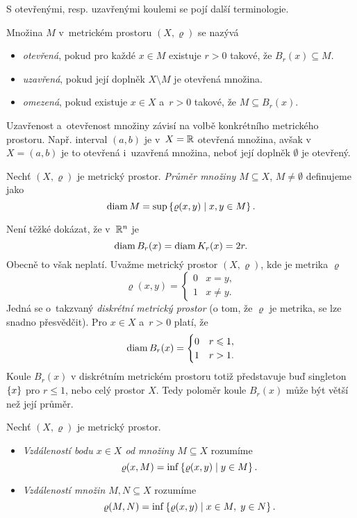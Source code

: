 S otevřenými, resp. uzavřenými koulemi se pojí další terminologie.
\begin{definition}\label{def:otevrena-uzavrena-omezena-mnozina}
     Množina $M$ v~metrickém prostoru $(X,\varrho)$ se nazývá
     \begin{itemize}
        \item \emph{otevřená}, pokud pro každé $x\in M$ existuje $r>0$ takové, že $B_r(x)\subseteq M$.
        \item \emph{uzavřená}, pokud její doplněk $X\setminus M$ je otevřená množina.
        \item \emph{omezená}, pokud existuje $x\in X$ a~$r>0$ takové, že $M\subseteq B_r(x)$.
     \end{itemize}
\end{definition}
Uzavřenost a~otevřenost množiny závisí na volbě konkrétního metrického prostoru. Např. interval $(a,b)$ je v~$X=\mathbb{R}$ otevřená množina, avšak v~$X=(a,b)$ je to otevřená i~uzavřená množina, neboť její doplněk $\emptyset$ je otevřený.
\begin{definition}\label{def:prumer-mnoziny}
    Nechť $(X,\varrho)$ je metrický prostor. \emph{Průměr množiny $M\subseteq X$}, $M\neq\emptyset$ definujeme jako
    \[\operatorname{diam}{M}=\sup\left\{\varrho(x,y)\mid x,y\in M\right\}.\]
\end{definition}
Není těžké dokázat, že v~$\mathbb{R}^n$ je
\[\operatorname{diam}{B_r(x)}=\operatorname{diam}{K_r(x)}=2r.\]
Obecně to však neplatí. Uvažme metrický prostor $(X,\varrho)$, kde je metrika $\varrho$
\[\varrho(x,y)=\begin{cases}
    0 & x=y,\\
    1 & x\neq y.
\end{cases}\]
Jedná se o~takzvaný \emph{diskrétní metrický prostor} (o tom, že $\varrho$ je metrika, se lze snadno přesvědčit). Pro $x\in X$ a~$r>0$ platí, že
\[\operatorname{diam}{B_r(x)}=\begin{cases}
    0 & r\leqslant 1,\\
    1 & r>1.
\end{cases}\]
Koule $B_r(x)$ v diskrétním metrickém prostoru totiž představuje buď singleton $\left\{x\right\}$ pro $r\leqslant 1$, nebo celý prostor $X$. Tedy poloměr koule $B_r(x)$ může být větší než její průměr.

\begin{definition}\label{def:vzdalenost-bodu-od-mnoziny-vzdalenost-mnozin}
    Nechť $(X,\varrho)$ je metrický prostor.
    \begin{itemize}
        \item {}\emph{Vzdáleností bodu $x\in X$ od množiny $M\subseteq X$} rozumíme
        \[\varrho(x,M)=\inf\left\{\varrho(x,y)\mid y\in M\right\}.\]
        \item {}\emph{Vzdáleností množin $M,N\subseteq X$} rozumíme
        \[\varrho(M,N)=\inf\left\{\varrho(x,y)\mid x\in M,\;y\in N\right\}.\]
    \end{itemize}
\end{definition}

